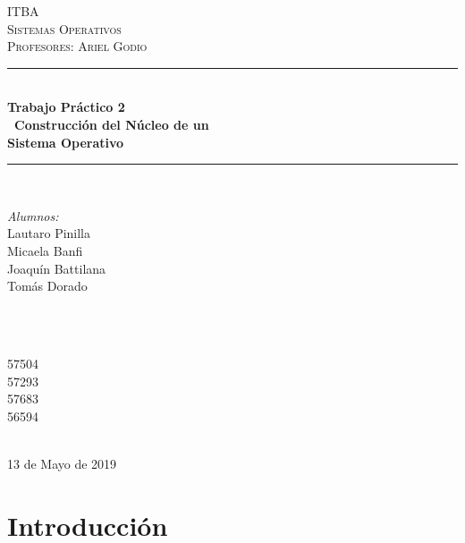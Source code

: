 \documentclass[12pt]{article}
\begin{document}
\begin{titlepage}
\newcommand{\HRule}{\rule{\linewidth}{0.5mm}} 
\center 

\textsc{\LARGE ITBA}\\[1.5cm] 
\textsc{\Large Sistemas Operativos}\\[0.5cm] 
\textsc{\large Profesores: Ariel Godio }\\[0.5cm] 

\HRule \\[0.4cm]
{ \huge \bfseries Trabajo Pr\'actico 2
\\\
Construcci\'on del N\'ucleo de un \\
Sistema Operativo }\\[0.4cm] 
\HRule \\[1.5cm]
 
\begin{minipage}{0.4\textwidth}
\begin{flushleft} \large
\emph{Alumnos:}\\
Lautaro Pinilla \\
Micaela Banfi \\
Joaqu\'in Battilana \\
Tom\'as Dorado \\
\end{flushleft}
\end{minipage}
~
\begin{minipage}{0.4\textwidth}
\begin{flushright} \large
\emph{} \\
57504 \\
57293 \\
57683 \\
56594 \\
\end{flushright}
\end{minipage}\\[2cm]


{\large 13 de Mayo de 2019}\\[2cm]

\vfil
\end{titlepage}

\section{Introducci\'on}
\end{document}
